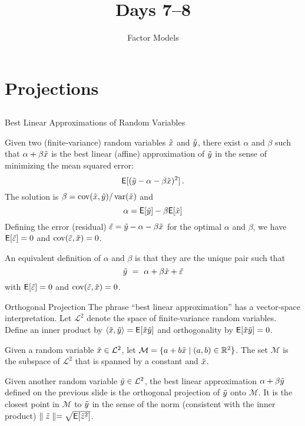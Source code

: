 

\title{\vskip 0.5in Days 7--8}
\subtitle{Factor Models\\
}





\begin{frame}[plain]
  \titlepage
\end{frame}



\section{Projections}\subsection{}

\begin{frame}{Best Linear Approximations of Random Variables}

Given two (finite-variance) random variables $\tilde{x}$ and $\tilde{y}$, there exist $\alpha$ and $\beta$ such that $\alpha + \beta \tilde{x}$ is the best linear (affine) approximation of $\tilde{y}$ in the sense of minimizing the mean squared error:
$$ \mathsf{E}[(\tilde{y} - \alpha - \beta \tilde{x})^2]\,.$$
The solution is $\beta = \operatorname{cov}(\tilde{x},\tilde{y})/\operatorname{var}(\tilde{x})$ and 
$$\alpha = \mathsf{E}[\tilde{y}] - \beta \mathsf{E}[\tilde{x}]$$
Defining the error (residual) $\tilde{\varepsilon} = \tilde{y} - \alpha - \beta \tilde{x}$ for the optimal $\alpha$ and $\beta$, we have  $\mathsf{E}[\tilde{\varepsilon}]= 0$ and $\operatorname{cov}(\tilde{\varepsilon},\tilde{x})=0$.

An equivalent definition of $\alpha$ and $\beta$ is that they are the unique pair such that
$$\tilde{y} \ = \ \alpha + \beta \tilde{x} + \tilde{\varepsilon}$$
with $\mathsf{E}[\tilde{\varepsilon}]= 0$ and $\operatorname{cov}(\tilde{\varepsilon},\tilde{x})=0$.
\end{frame}


\begin{frame}{Orthogonal Projection}
The phrase ``best linear approximation'' has a vector-space interpretation.  Let $\mathcal{L}^2$ denote the space of finite-variance random variables.  Define an inner product by $\langle \tilde{x},\tilde{y} \rangle = \mathsf{E}[\tilde{x}\tilde{y}]$ and orthogonality by $\mathsf{E}[\tilde{x}\tilde{y}] = 0$.  

Given a random variable $\tilde{x} \in \mathcal{L}^2$, let $\mathcal{M} = \{ a + b \tilde{x} \mid (a,b) \in \mathbb{R}^2\}$.  The set $\mathcal{M}$ is the subspace of $\mathcal{L}^2$ that is spanned by a constant and $\tilde{x}$.  

Given another random variable $\tilde{y} \in \mathcal{L}^2$, the best linear approximation $\alpha + \beta \tilde{y}$ defined on the previous slide is the orthogonal projection of $\tilde{y}$ onto $\mathcal{M}$.  It is the closest point in $\mathcal{M}$ to $\tilde{y}$ in the sense of the norm (consistent with the inner product) $\parallel \tilde{z} \parallel = \sqrt{\mathsf{E}[\tilde{z}^2]}$.
\end{frame}


